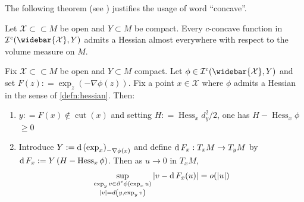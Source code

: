 The following theorem (see \cite[Proposition 3.4]{cordero2001riemannian}) justifies the usage of word ``concave''.
\begin{thm}
	\label{thm:c-concave_hessain}
	Let $\mathcal{X} \subset \subset M$ be open and $Y \subset M$ be compact.
	Every $c$-concave function in $\mathcal{I}^c(\widebar { \mathcal{X}}, Y )$ admits a Hessian
	almost everywhere with respect to the volume measure on $M$.
\end{thm}

\begin{prop} 
	\label{prop:differentiate_optimal_transport}
	Fix \( \mathcal{X} \subset \subset M \) be open and \( Y \subset M \) compact.
	Let \( \phi \in \mathcal{I} ^ { c } ( \widebar { \mathcal{X} } , Y ) \) and set \( F ( z ) : = \exp _ { z } ( - \nabla \phi ( z ) ) . \)
	Fix a point \( x \in \mathcal{X} \) where \( \phi \) admits a Hessian in the sense of \cref{defn:hessian}.
	Then:
	\begin{enumerate}
		\item \( y : = F ( x ) \notin \operatorname { cut } ( x ) \) and setting \( H : = \operatorname { Hess } _ { x } d _ { y } ^ { 2 } / 2 \), one has \( H - \operatorname { Hess } _ { x } \phi \) \( \geq 0 \)
		\item Introduce \( Y : = \operatorname{d} \left( \exp _ { x } \right) _ { - \nabla \phi ( x ) } \) and define \( \operatorname{d} F _ { x } : T _ { x } M \rightarrow T _ { y } M \) by
		      \( \operatorname{d} F _ { x } : = Y \left( H - \operatorname { Hess } _ { x } \phi \right) \).
		      Then as \( u \rightarrow 0 \) in \( T _ { x } M \),
		      \begin{equation}
			      \label{equa:differentiate_optimal_transport}
			      \sup _ {\substack {\exp _ { y } v \in \partial ^ { c } \phi \left( \exp _ { x } u \right) \\
					      | v | = d \left( y , \exp _ { y } v \right)} } \left| v - \operatorname{d} F _ { x } ( u ) \right| = o ( | u | )
		      \end{equation}

	\end{enumerate}
\end{prop}

